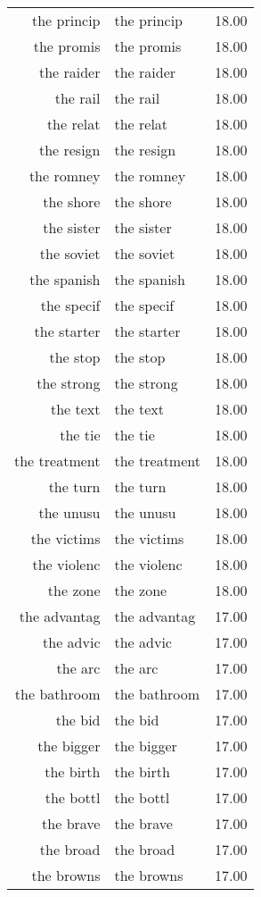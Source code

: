 \begin{table}[ht]
\begin{tabular}{rlr}
  the princip & the princip & 18.00 \\ 
  the promis & the promis & 18.00 \\ 
  the raider & the raider & 18.00 \\ 
  the rail & the rail & 18.00 \\ 
  the relat & the relat & 18.00 \\ 
  the resign & the resign & 18.00 \\ 
  the romney & the romney & 18.00 \\ 
  the shore & the shore & 18.00 \\ 
  the sister & the sister & 18.00 \\ 
  the soviet & the soviet & 18.00 \\ 
  the spanish & the spanish & 18.00 \\ 
  the specif & the specif & 18.00 \\ 
  the starter & the starter & 18.00 \\ 
  the stop & the stop & 18.00 \\ 
  the strong & the strong & 18.00 \\ 
  the text & the text & 18.00 \\ 
  the tie & the tie & 18.00 \\ 
  the treatment & the treatment & 18.00 \\ 
  the turn & the turn & 18.00 \\ 
  the unusu & the unusu & 18.00 \\ 
  the victims & the victims & 18.00 \\ 
  the violenc & the violenc & 18.00 \\ 
  the zone & the zone & 18.00 \\ 
  the advantag & the advantag & 17.00 \\ 
  the advic & the advic & 17.00 \\ 
  the arc & the arc & 17.00 \\ 
  the bathroom & the bathroom & 17.00 \\ 
  the bid & the bid & 17.00 \\ 
  the bigger & the bigger & 17.00 \\ 
  the birth & the birth & 17.00 \\ 
  the bottl & the bottl & 17.00 \\ 
  the brave & the brave & 17.00 \\ 
  the broad & the broad & 17.00 \\ 
  the browns & the browns & 17.00 \\ 

\end{tabular}
\end{table}
